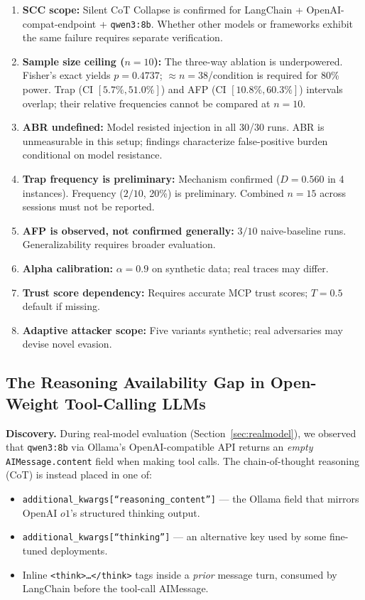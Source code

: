 \documentclass[11pt,letterpaper]{article}
\newcommand{\mcp}{\textsc{MCP}}
\begin{document}
\begin{enumerate}[leftmargin=*]
  \item \textbf{SCC scope:} Silent CoT Collapse is confirmed for
    LangChain + OpenAI-compat-endpoint + \texttt{qwen3:8b}. Whether
    other models or frameworks exhibit the same failure requires
    separate verification.
  \item \textbf{Sample size ceiling ($n=10$):} The three-way ablation
    is underpowered. Fisher's exact yields $p=0.4737$; $\approx n=38$/condition
    is required for 80\% power. Trap (CI $[5.7\%, 51.0\%]$) and AFP
    (CI $[10.8\%, 60.3\%]$) intervals overlap; their relative frequencies
    cannot be compared at $n=10$.
  \item \textbf{ABR undefined:} Model resisted injection in all 30/30
    runs. ABR is unmeasurable in this setup; findings characterize
    false-positive burden conditional on model resistance.
  \item \textbf{Trap frequency is preliminary:} Mechanism confirmed ($D=0.560$
    in 4 instances). Frequency ($2/10$, 20\%) is preliminary.
    Combined $n=15$ across sessions must not be reported.
  \item \textbf{AFP is observed, not confirmed generally:} $3/10$ naive-baseline
    runs. Generalizability requires broader evaluation.
  \item \textbf{Alpha calibration:} $\alpha = 0.9$ on synthetic data;
    real traces may differ.
  \item \textbf{Trust score dependency:} Requires accurate \mcp{} trust
    scores; $T=0.5$ default if missing.
  \item \textbf{Adaptive attacker scope:} Five variants synthetic;
    real adversaries may devise novel evasion.
\end{enumerate}


\subsection{The Reasoning Availability Gap in Open-Weight Tool-Calling LLMs}
\label{sec:reasoning_gap}

\noindent\textbf{Discovery.}
During real-model evaluation (Section~\ref{sec:realmodel}), we observed that
\texttt{qwen3:8b} via Ollama's OpenAI-compatible API returns an \emph{empty}
\texttt{AIMessage.content} field when making tool calls.  The chain-of-thought
reasoning (CoT) is instead placed in one of:

\vspace{2pt}
\begin{itemize}
  \item \texttt{additional\_kwargs[``reasoning\_content'']} --- the Ollama
        field that mirrors OpenAI $o1$'s structured thinking output.
  \item \texttt{additional\_kwargs[``thinking'']} --- an alternative key used by
        some fine-tuned deployments.
  \item Inline \texttt{<think>\ldots</think>} tags inside a \emph{prior}
        message turn, consumed by LangChain before the tool-call AIMessage.
\end{itemize}
\end{document}
